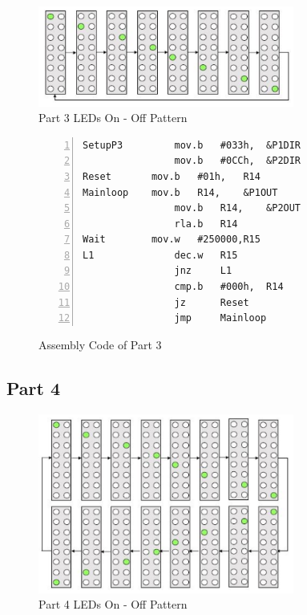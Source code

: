 \documentclass[pdftex,12pt,a4paper]{article}
\begin{document}
\begin{figure}[H]
    \centering
    \includegraphics[width=0.75\textwidth]{part3.png}
    \caption{Part 3 LEDs On - Off Pattern}
    \label{fig:part3}
\end{figure}

\begin{figure}[H]
    \centering
\begin{lstlisting}[language={[x86masm]Assembler}, numbers=left]
SetupP3         mov.b   #033h, 	&P1DIR  
                mov.b 	#0CCh, 	&P2DIR  
Reset		mov.b	#01h, 	R14  
Mainloop	mov.b 	R14,	&P1OUT	 
                mov.b	R14, 	&P2OUT	 
                rla.b	R14				 
Wait		mov.w 	#250000,R15  
L1              dec.w	R15  
                jnz     L1 
                cmp.b	#000h,  R14 
                jz      Reset  
                jmp     Mainloop 
\end{lstlisting}
    \caption{Assembly Code of Part 3}
    \label{code:part3}
\end{figure}



\subsection{Part 4}

\begin{figure}[H]
    \centering
    \includegraphics[width=0.75\textwidth]{part4.png}
    \caption{Part 4 LEDs On - Off Pattern}
    \label{fig:part4}
\end{figure}
\end{document}
